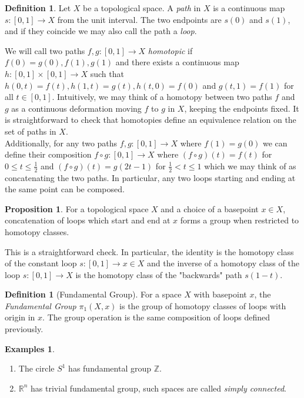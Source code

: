 \documentclass{article}
\theoremstyle{definition}
\newtheorem{proposition}[theorem]{Proposition}
\newtheorem{definition}[theorem]{Definition}
\newtheorem{examples}[theorem]{Examples}
\theoremstyle{remark}
\newcommand{\R}{\mathbb{R}}
\newcommand{\Z}{\mathbb{Z}}
\begin{document}
\begin{definition}
	Let $X$ be a topological space. 
	A \textit{path} in $X$ is a continuous map $s: [0,1] \to X$ from the unit interval.
	The two endpoints are $s(0)$ and $s(1)$, and if they coincide we may also call the path a \textit{loop}.
\end{definition}

We will call two paths $f,g: [0,1] \to X$ \textit{homotopic} if $f(0) = g(0), f(1), g(1)$ and there exists a continuous map $h: [0,1] \times [0,1] \to X$ such that $h(0,t) = f(t), h(1,t) = g(t), h(t,0) = f(0)$ and $g(t,1) = f(1)$ for all $t \in [0,1]$.
Intuitively, we may think of a homotopy between two paths $f$ and $g$ as a continuous deformation moving $f$ to $g$ in $X$, keeping the endpoints fixed. 
It is straightforward to check that homotopies define an equivalence relation on the set of paths in $X$.\\
\indent Additionally, for any two paths $f,g: [0,1] \to X$ where $f(1) = g(0)$ we can define their composition $f \circ g: [0,1] \to X$ where $(f \circ g )(t) = f(t)$ for $0 \leq t \leq \frac{1}{2}$ and $(f \circ g)(t) = g(2t - 1)$ for $ \frac{1}{2} < t \leq 1$ which we may think of as concatenating the two paths.
In particular, any two loops starting and ending at the same point can be composed.

\begin{proposition}
	For a topological space $X$ and a choice of a basepoint $x \in X$, concatenation of loops which start and end at $x$ forms a group when restricted to homotopy classes.
\end{proposition}

This is a straightforward check. 
In particular, the identity is the homotopy class of the constant loop $s: [0,1] \to x \in X$ and the inverse of a homotopy class of the loop $s: [0,1] \to X$ is the homotopy class of the "backwards" path $s(1-t)$.

\begin{definition}[Fundamental Group]
	For a space $X$ with basepoint $x$, the \textit{Fundamental Group} $\pi_1(X,x)$	is the group of homotopy classes of loops with origin in $x$.
	The group operation is the same composition of loops defined previously.
\end{definition}

\begin{examples} \text{}
	\begin{enumerate}
		\item The circle $S^1$ has fundamental group $\Z$.
		\item $\R^n$ has trivial fundamental group, such spaces are called \textit{simply connected}.
	\end{enumerate}
	
\end{examples}
\end{document}
